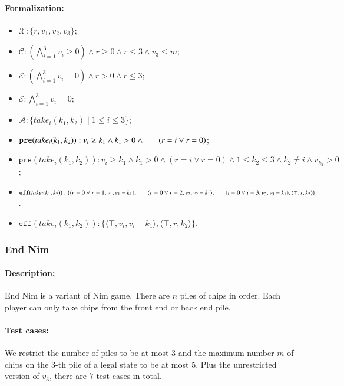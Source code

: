 \documentclass[review]{elsarticle}
\newcommand{\set}[1]{\{ #1 \}}
\newcommand{\tuple}[1]{\langle {#1} \rangle}
\newcommand{\true}{\top}
\newcommand{\statevar}{\mathcal{X}}
\newcommand{\act}{\mathcal{A}}
\newcommand{\constraint}{\mathcal{C}}
\newcommand{\estate}{\mathcal{E}}
\newcommand{\pre}{\mathtt{pre}}
\newcommand{\eff}{\mathtt{eff}}
\begin{document}
\paragraph{Formalization:}
\begin{itemize}
	\item $\statevar: \set{r, v_1, v_2, v_3}$;
	\item $\constraint: (\bigwedge_{i=1}^{3} v_i \ge 0) \wedge r \ge 0 \wedge r \le 3 \wedge v_3 \le m$;
	\item $\estate: (\bigwedge_{i=1}^{3} v_i = 0)\wedge r > 0 \wedge r \le 3 $;
	\item {\color{red}$\estate: \bigwedge_{i=1}^{3} v_i = 0$;}
	\item $\act:\set{take_i(k_1,k_2) {\mid}1 \le i\le 3}$;
	\item $\pre(take_i(k_1,k_2)) : v_i \ge k_1 \wedge k_1 > 0 \wedge \\ \hspace*{6mm}
	(r = i \vee r = 0)$;
	\item {\color{red}$\pre(take_i(k_1,k_2)) : v_i \ge k_1 \wedge k_1 > 0 \wedge (r = i \vee r = 0) \wedge 1 \le k_2 \le 3 \wedge k_2 \neq i \wedge v_{k_2} > 0$;}
	\item $\eff(take_i(k_1,k_2)) : \set{\tuple{r = 0\vee r = 1, v_1, v_1-k_1},\\ \hspace*{6mm}
		\tuple{r = 0\vee r = 2, v_2, v_2-k_1}, \\ \hspace*{6mm}
		\tuple{i=0\vee i=3, v_3, v_3-k_1},\tuple{\true, r, k_2}}$.
	\item {\color{red}$\eff(take_i(k_1,k_2)) : \set{\tuple{\true, v_i, v_i-k_1}, \tuple{\true, r, k_2}}$.}
\end{itemize}

\subsubsection{End Nim \protect\cite{AlbN2001}}	
\paragraph{Description:} 
End Nim is a variant of Nim game.
There are $n $ piles of chips in order.
Each player can only take chips from the front end or back end pile.

\paragraph{Test cases:}
We restrict the number of piles to be at most $3$ and the maximum number $m$ of chips on the $3$-th pile of a legal state to be at most $5$.
Plus the unrestricted version of $v_3$, there are $7$ test cases in total.
\end{document}
